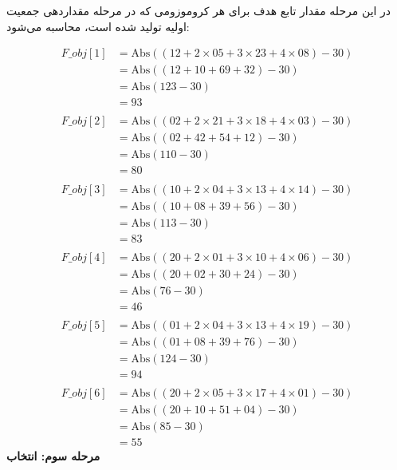 \documentclass[11pt]{article}
\begin{document}
  در این مرحله مقدار تابع هدف برای هر کروموزومی که در مرحله مقداردهی جمعیت اولیه تولید شده است، محاسبه می‌شود: 

\[
\begin{align*}
F\_obj[1] &= \text{Abs}\left(( 12 + 2 \times 05 + 3 \times 23 + 4 \times 08 ) - 30\right) \\ 
&= \text{Abs}\left((12 + 10 + 69 + 32) - 30\right) \\ 
&= \text{Abs}(123 - 30) \\ &= 93 \\ 
\\
F\_obj[2] 
&= \text{Abs}\left((02 + 2 \times 21 + 3 \times 18 + 4 \times 03) - 30\right) \\ 
&= \text{Abs}\left((02 + 42 + 54 + 12) - 30\right) \\ 
&= \text{Abs}(110 - 30) \\ &= 80 \\ 
\\ 
F\_obj[3] 
&= \text{Abs}\left((10 + 2 \times 04 + 3 \times 13 + 4 \times 14) - 30\right) \\ 
&= \text{Abs}\left((10 + 08 + 39 + 56) - 30\right) \\ 
&= \text{Abs}(113 - 30) \\ &= 83 \\ 
\\ 
F\_obj[4] &= \text{Abs}\left((20 + 2 \times 01 + 3 \times 10 + 4 \times 06) - 30\right) \\ 
&= \text{Abs}\left((20 + 02 + 30 + 24) - 30\right) \\ &= \text{Abs}(76 - 30) \\ 
&= 46 \\ 
\\ 
F\_obj[5] &= \text{Abs}\left((01 + 2 \times 04 + 3 \times 13 + 4 \times 19) - 30\right) \\ &= \text{Abs}\left((01 + 08 + 39 + 76) - 30\right) 
\\ 
&= \text{Abs}(124 - 30) \\ &= 94 \\ 
\\ 
F\_obj[6] 
&= \text{Abs}\left((20 + 2 \times 05 + 3 \times 17 + 4 \times 01) - 30\right) \\
&= \text{Abs}\left((20 + 10 + 51 + 04) - 30\right) \\ &= \text{Abs}(85 - 30) \\ 
&= 55 
\end{align*}
\]
\textbf{ مرحله سوم: انتخاب}
\end{document}
